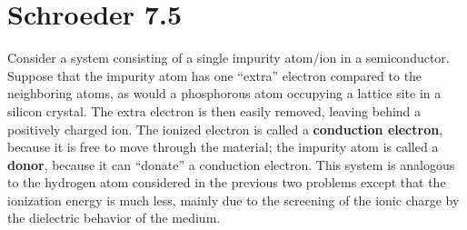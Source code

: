 \documentclass[10pt]{article}
\begin{document}
	\section*{Schroeder 7.5}
	Consider a system consisting of a single impurity atom/ion in a semiconductor. Suppose that the impurity 
	atom has one ``extra'' electron compared to the neighboring atoms, as would a phosphorous atom occupying 
	a lattice site in a silicon crystal. The extra electron is then easily removed, leaving behind 
	a positively charged ion. The ionized electron is called a \textbf{conduction electron},
	because it is free to move through the material; the impurity atom is called a \textbf{donor}, because it 
	can ``donate'' a conduction electron. This system is analogous to the hydrogen atom considered in the
	previous two problems except that the ionization energy is much less, mainly due to the 
	screening of the ionic charge by the dielectric behavior of the medium. 
\end{document}
